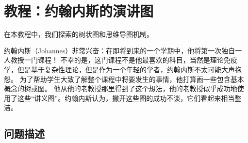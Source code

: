 %
%
%


\section{教程：约翰内斯的演讲图}


在本教程中，我们探索\tikzname 的树状图和思维导图机制。


约翰内斯（Johannes）非常兴奋：在即将到来的一个学期中，他将第一次独自一人教授一门课程！ 不幸的是，这门课程不是他最喜欢的科目，当然是理论免疫学，但是基于复杂性理论，但是作为一个年轻的学者，约翰内斯不太可能大声抱怨。 为了帮助学生大致了解整个课程中将要发生的事情，他打算画一些包含基本概念的树或图。 他从他的老教授那里得到了这个想法，他的老教授似乎成功地使用了这些``讲义图''。约翰内斯认为，撇开这些图的成功不谈，它们看起来相当整洁。


\subsection{问题描述}


